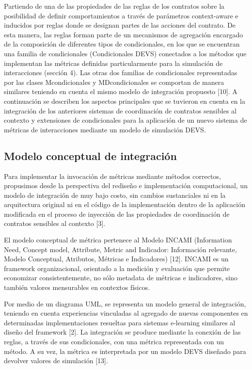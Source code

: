 Partiendo de una de las propiedades de las reglas de los contratos sobre la
posibilidad de definir comportamientos a través de parámetros context-aware e
inducidos por reglas donde se designan partes de las acciones del contrato. De
esta manera, las reglas forman parte de un mecanismos de agregación encargado de
la composición de diferentes tipos de condicionales, en los que se encuentran
una familia de condicionales (Condicionales DEVS) conectados a los métodos que
implementan las métricas definidas particularmente para la simulación de
interacciones (sección 4). Las otras dos familias de condicionales representadas
por las clases Mcondicionales y MDcondicionales se comportan de manera similares
teniendo en cuenta el mismo modelo de integración propuesto [10].
A continuación se describen los aspectos principales que se tuvieron en cuenta
en la integración de los anteriores sistemas de coordinación de contratos
sensibles al contexto y extensiones de condicionales para la aplicación de un
nuevo sistema de métricas de interacciones mediante un modelo de simulación
DEVS. 

\subsection{Modelo conceptual de integración}

Para implementar la invocación de métricas mediante métodos correctos,
propusimos  desde la perspectiva del rediseño e implementación computacional, un
modelo de integración de muy bajo costo, sin cambios sustanciales ni en la
arquitectura original  ni en el código de la implementación dentro de la
aplicación modificada en el proceso de inyección de las propiedades de
coordinación de contratos sensibles al contexto [3].


El modelo conceptual de métrica pertenece al Modelo INCAMI (Information Need,
Concept model, Attribute, Metric and Indicador: Información relevante, Modelo
Conceptual, Atributos, Métricas e Indicadores) [12]. INCAMI es un framework
organizacional, orientado a la medición y evaluación que permite economizar
consistentemente, no sólo metadata de métricas e indicadores, sino también
valores mensurables en contextos físicos.


Por medio de un diagrama UML, se representa un modelo general de integración,
teniendo en cuenta experiencias vinculadas al agregado de nuevas componentes en
determinadas implementaciones resueltas para sistemas e-learning similares al
diseño del framework [2]. La integración se produce mediante la conexión de las
reglas, a través de sus condicionales, con una métrica representada con un
método. A su vez,  la métrica es interpretada por un modelo DEVS diseñado para
devolver valores de simulación [13].


